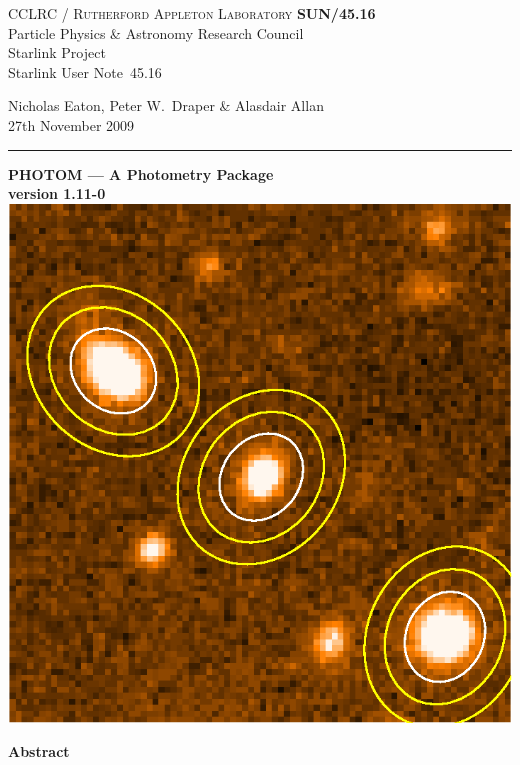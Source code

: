 \documentclass[twoside,11pt]{article}
\newcommand{\stardoccategory}  {Starlink User Note}
\newcommand{\stardocinitials}  {SUN}
\newcommand{\stardocnumber}    {45.16}
\newcommand{\stardocauthors}   {Nicholas Eaton, Peter W.\ Draper \& Alasdair Allan}
\newcommand{\stardocdate}      {27th November 2009}
\newcommand{\stardoctitle}     {PHOTOM --- A Photometry Package }
\newcommand{\stardocversion}   {version 1.11-0}
\newcommand{\stardocname}{\stardocinitials /\stardocnumber}
\newenvironment{latexonly}{}{}
\renewcommand{\_}{\texttt{\symbol{95}}}
\begin{document}
\thispagestyle{empty}

\begin{latexonly}
   CCLRC / \textsc{Rutherford Appleton Laboratory} \hfill \textbf{\stardocname}\\
   {\large Particle Physics \& Astronomy Research Council}\\
   {\large Starlink Project\\}
   {\large \stardoccategory\ \stardocnumber}
   \begin{flushright}
   \stardocauthors\\
   \stardocdate
   \end{flushright}
   \vspace{-4mm}
   \rule{\textwidth}{0.5mm}
   \vspace{5mm}
   \begin{center}
   {\LARGE\bf  \stardoctitle \\ [2.5ex]}
   {\Large\bf  \stardocversion \\ [4ex]}
   \includegraphics{sun45fig.ps}
   \end{center}
   \vspace{5mm}


   \vspace{10mm}
   \begin{center}
      {\Large\textbf{Abstract}}
   \end{center}
\end{latexonly}
\end{document}
